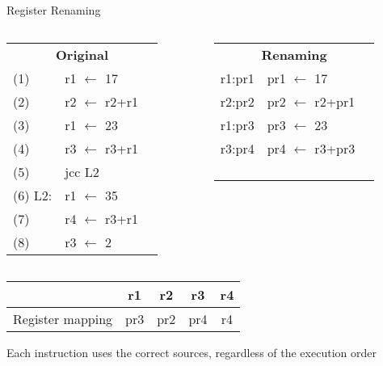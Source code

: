 \documentclass[aspectratio=169,12pt]{beamer}
\begin{document}
\begin{frame}{Register Renaming}
  \begin{columns}
    \begin{column}{0.5\textwidth}
      \begin{tabular}{lll}
        \multicolumn{3}{c}{\textbf{Original}} \\
        (1) & r1 $\leftarrow$ 17 & \\
        (2) & r2 $\leftarrow$ r2+r1 & \\
        (3) & r1 $\leftarrow$ 23 & \\
        (4) & r3 $\leftarrow$ r3+r1 & \\
        (5) & jcc L2 & \\
        (6) L2: & r1 $\leftarrow$ 35 & \\
        (7) & r4 $\leftarrow$ r3+r1 & \\
        (8) & r3 $\leftarrow$ 2 & \\
      \end{tabular}
    \end{column}
    
    \begin{column}{0.5\textwidth}
      \begin{tabular}{lll}
        \multicolumn{3}{c}{\textbf{Renaming}} \\
        r1:pr1 & pr1 $\leftarrow$ 17 & \\
        r2:pr2 & pr2 $\leftarrow$ r2+pr1 & \\
        r1:pr3 & pr3 $\leftarrow$ 23 & \\
        r3:pr4 & pr4 $\leftarrow$ r3+pr3 & \\
        & & \\
        & & \\
        & & \\
        & & \\
      \end{tabular}
    \end{column}
  \end{columns}
  
  \vspace{0.5cm}
  \begin{center}
    \begin{tabular}{|c|c|c|c|c|}
      \hline
      & r1 & r2 & r3 & r4 \\
      \hline
      Register mapping & pr3 & pr2 & pr4 & r4 \\
      \hline
    \end{tabular}
  \end{center}
  
  \begin{center}
    \colorbox{green!30}{Each instruction uses the correct sources, regardless of the execution order}
  \end{center}
\end{frame}
\end{document}
